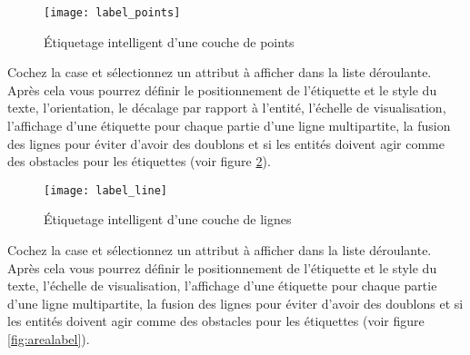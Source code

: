 \begin{figure}[ht]
\centering
   \texttt{[image: label\_points]}
   \caption{Étiquetage intelligent d'une couche de points \nixcaption}\label{fig:pointlabel}
\end{figure}


Cochez la case  et sélectionnez un attribut à afficher dans la liste déroulante. Après cela vous pourrez définir le positionnement de l'étiquette et le style du texte, l'orientation, le décalage par rapport à l'entité, l'échelle de visualisation, l'affichage d'une étiquette pour chaque partie d'une ligne multipartite, la fusion des lignes pour éviter d'avoir des doublons et si les entités doivent agir comme des obstacles pour les étiquettes (voir figure \ref{fig:linelabel}).

\begin{figure}[ht]
\centering
   \texttt{[image: label\_line]}
   \caption{Étiquetage intelligent d'une couche de lignes \nixcaption}\label{fig:linelabel}
\end{figure}


Cochez la case  et sélectionnez un attribut à 
afficher dans la liste déroulante. Après cela vous pourrez définir le 
positionnement de l'étiquette et le style du texte, l'échelle de visualisation, 
l'affichage d'une étiquette pour chaque partie d'une ligne multipartite, la 
fusion des lignes pour éviter d'avoir des doublons et si les entités doivent 
agir comme des obstacles pour les étiquettes (voir figure \ref{fig:arealabel}).

